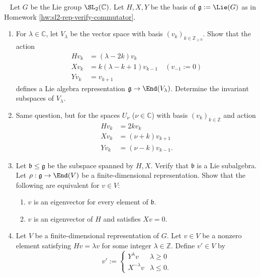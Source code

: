 \documentclass[reqno]{amsart} 
\begin{document}
\begin{homework}
~ Let $G$ be the Lie group $\SL_2(\mathbb{C})$.  Let $H,X,Y$ be the basis of $\mathfrak{g} := \Lie(G)$ as in Homework \ref{hw:sl2-rep-verify-commutator}.
  \begin{enumerate}
  \item For $\lambda \in \mathbb{C}$, let $V_\lambda$ be the vector space with basis $(v_k)_{k \in \mathbb{Z}_{\geq 0}}$.  Show that the action
    \begin{align*}
      H v_k &= (\lambda - 2 k) v_k \\
      X v_k &= k ( \lambda - k + 1) v_{k-1}
              \quad (v_{-1} := 0) \\
      Y v_k &= v_{k+1}
    \end{align*}
    defines a Lie algebra representation $\mathfrak{g} \rightarrow \End(V_{\lambda})$.  Determine the invariant subspaces of $V_\lambda$.
  \item Same question, but for the spaces $U_\nu$ ($\nu \in \mathbb{C}$) with basis $(v_k)_{k \in \mathbb{Z}}$ and action
    \begin{align*}
      H v_k &= 2 k v_k \\
      X v_k &= (\nu + k) v_{k+1} \\
      Y v_k &= (\nu - k) v_{k-1}.
    \end{align*}
  \item Let $\mathfrak{b} \leq \mathfrak{g}$ be the subspace spanned by $H,X$.  Verify that $\mathfrak{b}$ is a Lie subalgebra.  Let $\rho : \mathfrak{g} \rightarrow \End(V)$ be a finite-dimensional representation.  Show that the following are equivalent for $v \in V$:
    \begin{enumerate}
    \item $v$ is an eigenvector for every element of $\mathfrak{b}$.
    \item $v$ is an eigenvector of $H$ and satisfies $X v = 0$.
    \end{enumerate}
  \item Let $V$ be a finite-dimensional representation of $G$.  Let $v \in V$ be a nonzero element satisfying $H v = \lambda v$ for some integer $\lambda \in \mathbb{Z}$.  Define $v' \in V$ by
    \begin{equation*}
      v' :=
      \begin{cases}
        Y^\lambda v & \lambda \geq 0
        \\
        X^{-\lambda} v & \lambda \leq 0.
      \end{cases}
    \end{equation*}

\end{enumerate}
\end{homework}
\end{document}

